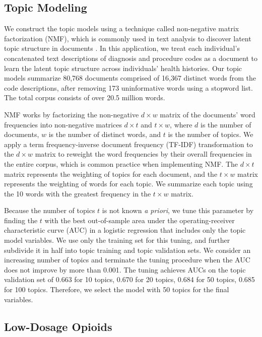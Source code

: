 \documentclass[9pt,twoside,lineno]{pnas-new}
\begin{document}
\subsection{Topic Modeling}

We construct the topic models using a technique called non-negative matrix factorization (NMF), which is commonly used in text analysis to discover latent topic structure in documents \cite{fevotte}. In this application, we treat each individual's concatenated text descriptions of diagnosis and procedure codes as a document to learn the latent topic structure across individuals' health histories. Our topic models summarize 80,768 documents comprised of 16,367 distinct words from the code descriptions, after removing 173 uninformative words using a stopword list. The total corpus consists of over 20.5 million words.

NMF works by factorizing the non-negative $d \times w$ matrix of the documents' word frequencies into non-negative matrices $d \times t$ and $t \times w$, where $d$ is the number of documents, $w$ is the number of distinct words, and $t$ is the number of topics. We apply a term frequency-inverse document frequency (TF-IDF) transformation to the $d \times w$ matrix to reweight the word frequencies by their overall frequencies in the entire corpus, which is common practice when implementing NMF. The $d \times t$ matrix represents the weighting of topics for each document, and the $t \times w$ matrix represents the weighting of words for each topic. We summarize each topic using the 10 words with the greatest frequency in the $t \times w$ matrix.

Because the number of topics $t$ is not known \emph{a priori}, we tune this parameter by finding the $t$ with the best out-of-sample area under the operating-receiver characteristic curve (AUC) in a logistic regression that includes only the topic model variables. We use only the training set for this tuning, and further subdivide it in half into topic training and topic validation sets. We consider an increasing number of topics and terminate the tuning procedure when the AUC does not improve by more than 0.001. The tuning achieves AUCs on the topic validation set of 0.663 for 10 topics, 0.670 for 20 topics, 0.684 for 50 topics, 0.685 for 100 topics. Therefore, we select the model with 50 topics for the final variables.

\subsection{Low-Dosage Opioids}
\end{document}

